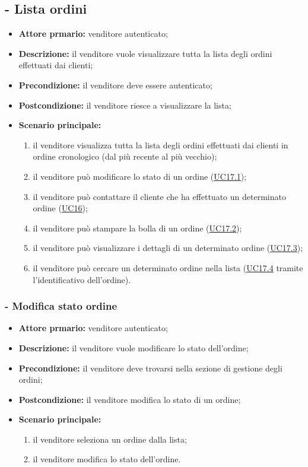 \subsection{ - Lista ordini}
\begin{itemize}
    \item \textbf{Attore prmario:} venditore autenticato;
    \item \textbf{Descrizione:} il venditore vuole visualizzare tutta la lista degli ordini effettuati dai clienti;
    \item \textbf{Precondizione:} il venditore deve essere autenticato;
    \item \textbf{Postcondizione:} il venditore riesce a visualizzare la lista;
    \item \textbf{Scenario principale:}
          \begin{enumerate}
              \item il venditore visualizza tutta la lista degli ordini effettuati dai clienti in ordine cronologico (dal più recente al più vecchio);
              \item il venditore può modificare lo stato di un ordine (\hyperref[UC17.1]{UC17.1});
              \item il venditore può contattare il cliente che ha effettuato un determinato ordine (\hyperref[UC16]{UC16});
              \item il venditore può stampare la bolla di un ordine (\hyperref[UC17.2]{UC17.2});
              \item il venditore può visualizzare i dettagli di un determinato ordine (\hyperref[UC17.3]{UC17.3});
              \item il venditore può cercare un determinato ordine nella lista (\hyperref[UC17.4]{UC17.4} tramite l'identificativo dell'ordine).
            \end{enumerate}
\end{itemize}

\stepsubUserCase
\subsubsection{- Modifica stato ordine}
\begin{itemize}
    \item \textbf{Attore prmario:} venditore autenticato;
    \item \textbf{Descrizione:} il venditore vuole modificare lo stato dell'ordine;
    \item \textbf{Precondizione:} il venditore deve trovarsi nella sezione di gestione degli ordini;
    \item \textbf{Postcondizione:} il venditore modifica lo stato di un ordine;
    \item \textbf{Scenario principale:}
          \begin{enumerate}
              \item il venditore seleziona un ordine dalla lista;
              \item il venditore modifica lo stato dell'ordine.
          \end{enumerate}
\end{itemize}

